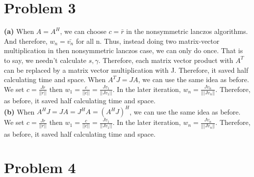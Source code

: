 \documentclass[11pt]{article}
\begin{document}
\section{Problem 3}
{\bf (a)}	When $A=A^H$, we can choose $c=\bar{r}$ in the nonsymmetric lanczos algorithms. And therefore, $w_n=\bar{v_n}$ for all n. Thus, instead doing two matrix-vector multiplication in then nonsymmetric lanczos case, we can only do once. That is to say, we needn't calculate $s, \gamma$. Therefore, each matrix vector product with $A^T$ can be replaced by a matrix vector multiplication with J. Therefore, it saved half calculating time and space. When $A^TJ=JA$, we can use the same idea as before.  We set $c=\frac{Jr}{||r||}$ then $w_1=\frac{c}{||c||}=\frac{Jv_1}{||Jv_1||}$. In the later iteration, $w_n=\frac{Jv_n}{|||Jv_n||}$. Therefore, as before, it saved half calculating time and space.\\
{\bf (b)}  When $A^HJ=JA=J^HA=(A^HJ)^H$, we can use the same idea as before.  We set $c=\frac{Jr}{||r||}$ then $w_1=\frac{c}{||c||}=\frac{Jv_1}{||Jv_1||}$. In the later iteration, $w_n=\frac{Jv_n}{|||Jv_n||}$. Therefore, as before, it saved half calculating time and space.  \\

\section{Problem 4}
\end{document}
